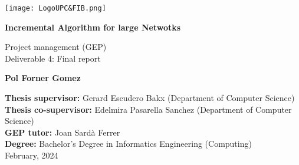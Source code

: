 \begin{titlepage}
    \centering

    \vspace*{1cm}
    \texttt{[image: LogoUPC\&FIB.png]}

    \vspace*{2cm}
    {\huge \textbf{Incremental Algorithm for large Netwotks}}

    \vspace*{.5cm}
    {\LARGE Project management (GEP)} \\
    {\LARGE Deliverable 4: Final report}


    \vspace{2cm}

    \LARGE

    \begin{minipage}{.5\textwidth}
        \centering
        \textbf{Pol Forner Gomez}
    \end{minipage}

    \large

    \vfill

    \textbf{Thesis supervisor:}  Gerard Escudero Bakx (Department of Computer Science) \\
    \textbf{Thesis co-supervisor:}  Edelmira Pasarella Sanchez (Department of Computer Science) \\
    \textbf{GEP tutor:}  Joan Sardà Ferrer \\
    \textbf{Degree:}  Bachelor's Degree in Informatics Engineering (Computing) \\

    February, 2024
\end{titlepage}